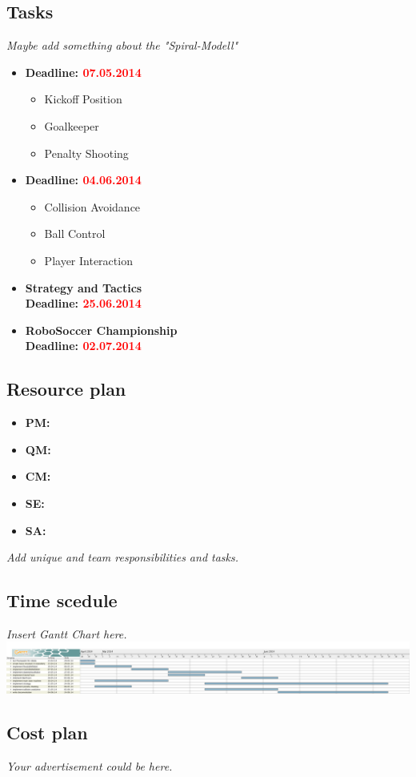 \documentclass[12pt]{article}
\begin{document}
\subsection{Tasks}
\textit{Maybe add something about the "Spiral-Modell"}
\begin{itemize}
	\item \textbf{Deadline: \textcolor{red}{07.05.2014}}
	\begin{itemize}
		\item Kickoff Position
		\item Goalkeeper
		\item Penalty Shooting
	\end{itemize}
	
	\item \textbf{Deadline: \textcolor{red}{04.06.2014}}
	\begin{itemize}
		\item Collision Avoidance
		\item Ball Control
		\item Player Interaction
	\end{itemize}
	
	\item \textbf{Strategy and Tactics}\\
	\textbf{Deadline: \textcolor{red}{25.06.2014}}
	
	\item \textbf{RoboSoccer Championship}\\
	\textbf{Deadline: \textcolor{red}{02.07.2014}}
\end{itemize}

\subsection{Resource plan}

\begin{itemize}
	\item \textbf{PM:} 
	\item \textbf{QM:} 
	\item \textbf{CM:} 
	\item \textbf{SE:} 
	\item \textbf{SA:} 
\end{itemize}
\textit{Add unique and team responsibilities and tasks.}

\subsection{Time scedule}
\textit{Insert Gantt Chart here.}\\
\includegraphics[width=\textwidth]{../ganttchart.png}

\subsection{Cost plan}
\textit{Your advertisement could be here.}
\end{document}
